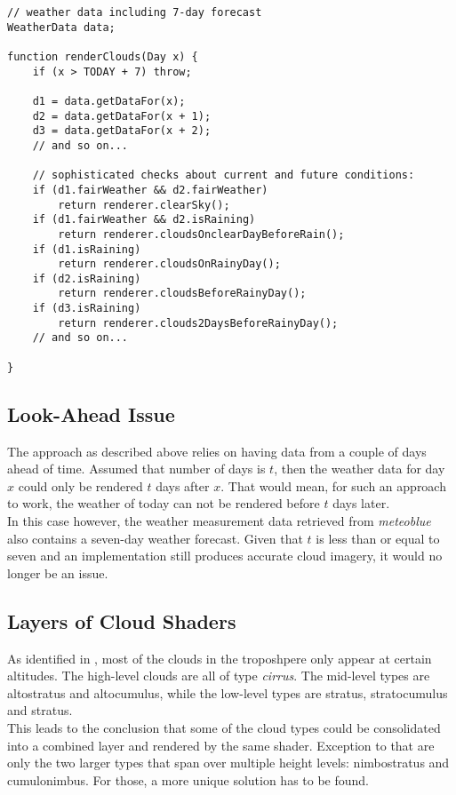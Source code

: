 \begin{lstlisting}[language=HLSL, caption=Pseudo-code of cloud render algorithm., label=lst:pseudo:algorithm]
// weather data including 7-day forecast
WeatherData data;

function renderClouds(Day x) {
    if (x > TODAY + 7) throw;

    d1 = data.getDataFor(x);
    d2 = data.getDataFor(x + 1);
    d3 = data.getDataFor(x + 2);
    // and so on...

    // sophisticated checks about current and future conditions:
    if (d1.fairWeather && d2.fairWeather)
        return renderer.clearSky();
    if (d1.fairWeather && d2.isRaining)
        return renderer.cloudsOnclearDayBeforeRain();
    if (d1.isRaining)
        return renderer.cloudsOnRainyDay();
    if (d2.isRaining) 
        return renderer.cloudsBeforeRainyDay();
    if (d3.isRaining) 
        return renderer.clouds2DaysBeforeRainyDay();
    // and so on...
    
}
\end{lstlisting}

\clearpage

\subsection{Look-Ahead Issue}
The approach as described above relies on having data from a couple of days ahead of time. Assumed that number of days is $t$, then the weather data for day $x$ could only be rendered $t$ days after $x$.
That would mean, for such an approach to work, the weather of today can not be rendered before $t$ days later.
\\
In this case however, the weather measurement data retrieved from \emph{meteoblue} also contains a seven-day weather forecast. 
Given that $t$ is less than or equal to seven and an implementation still produces accurate cloud imagery, it would no longer be an issue.

\subsection{Layers of Cloud Shaders}
As identified in , most of the clouds in the troposhpere only appear at certain \gls{altitude}s.
The high-level clouds are all of type \emph{cirrus}.
The mid-level types are altostratus and altocumulus, while the low-level types are stratus, stratocumulus and stratus.
\\
This leads to the conclusion that some of the cloud types could be consolidated into a combined layer and rendered by the same shader.
Exception to that are only the two larger types that span over multiple height levels: nimbostratus and cumulonimbus. For those, a more unique solution has to be found.


